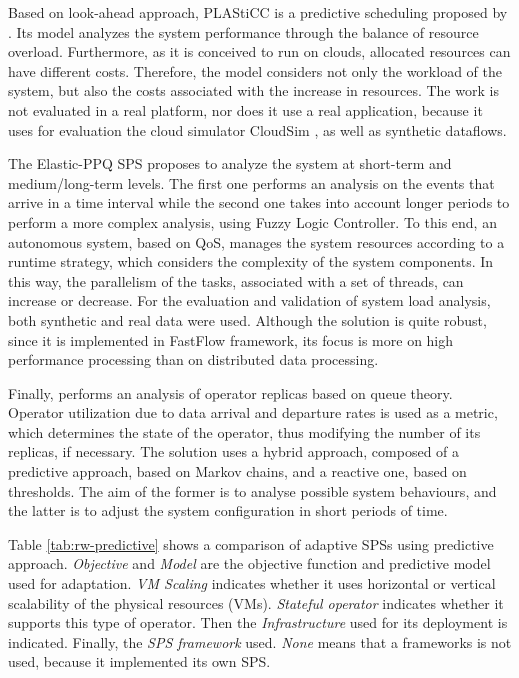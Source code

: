 Based on look-ahead approach, PLAStiCC is a predictive scheduling proposed by \cite{KumbhareSP14}. Its model analyzes the system performance through the balance of resource overload. Furthermore, as it is conceived to run on clouds, allocated resources can have different costs. Therefore, the model considers not only the workload of the system, but also the costs associated with the increase in resources. The work is not evaluated in a real platform, nor does it use a real application, because it uses for evaluation the cloud simulator CloudSim \cite{Calheiros2009CloudSim}, as well as synthetic dataflows.

The Elastic-PPQ SPS \cite{MencagliTD18} proposes to analyze the system at short-term and medium/long-term levels. The first one performs an analysis on the events that arrive in a time interval while the second one takes into account longer periods to perform a more complex analysis, using Fuzzy Logic Controller.  To this end, an autonomous system, based on QoS, manages the system resources according to a runtime strategy, which considers the complexity of the system components. In this way, the parallelism of the tasks, associated with a set of threads, can increase or decrease. For the evaluation and validation of system load analysis, both synthetic and real data were used. Although the solution is quite robust, since it is implemented in FastFlow \cite{aldinucci2017fastflow} framework, its focus is more on high performance processing than on distributed data processing.

Finally, \cite{HidalgoCR17} performs an analysis of operator replicas based on queue theory. Operator utilization due to data arrival and departure rates is used as a metric, which determines the state of the operator, thus modifying the number of its replicas, if necessary. The solution uses a hybrid approach, composed of a predictive approach, based on Markov chains, and a reactive one, based on thresholds. The aim of the former is to analyse possible system behaviours, and the latter is to adjust the system configuration in short periods of time.

Table \ref{tab:rw-predictive} shows a comparison of adaptive SPSs using predictive approach. \textit{Objective} and \textit{Model} are the objective function and predictive model used for adaptation. \textit{VM Scaling} indicates whether it uses horizontal or vertical scalability of the physical resources (VMs). \textit{Stateful operator} indicates whether it supports this type of operator. Then the \textit{Infrastructure} used for its deployment is indicated. Finally, the \textit{SPS framework} used. \textit{None} means that a frameworks is not used, because it implemented its own SPS.

